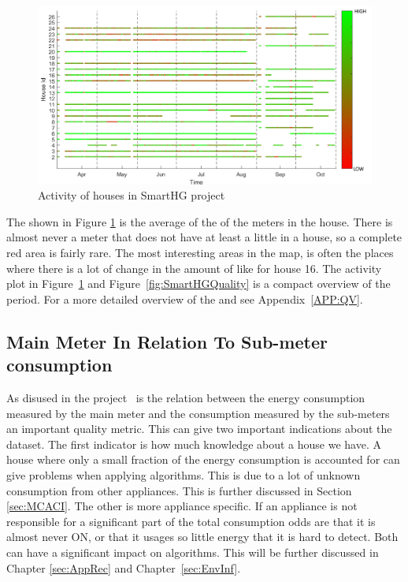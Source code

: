 \begin{figure}[H]
\centering
\includegraphics[width=1\textwidth]{billeder/ActivityBig.png}
\caption{Activity of houses in SmartHG project}
\label{fig:ActivityMap}
\end{figure}

The  shown in Figure \ref{fig:ActivityMap} is the average of the  of the meters in the house. There is almost never a meter that does not have at least a little  in a house, so a complete red area is fairly rare. The most interesting areas in the  map, is often the places where there is a lot of change in the amount of  like for house 16. The activity plot in Figure~\ref{fig:ActivityMap} and Figure~\ref{fig:SmartHGQuality} is a compact overview of the period. For a more detailed overview of the  and  see Appendix~\ref{APP:QV}. 

\subsection{Main Meter In Relation To Sub-meter consumption}
\label{sec:MMIRTSM}
As disused in the  project~\citep{RefWorks:21} is the relation between the energy consumption measured by the main meter and the consumption measured by the sub-meters an important quality metric. This can give two important indications about the dataset. The first indicator is how much knowledge about a house we have. A house where only a small fraction of the energy consumption is accounted for can give problems when applying  algorithms. This is due to a lot of unknown consumption from other appliances. This is further discussed in Section \ref{sec:MCACI}. The other is more appliance specific. If an appliance is not responsible for a significant part of the total consumption odds are that it is almost never ON, or that it usages so little energy that it is hard to detect. Both can have a significant impact on  algorithms. This will be further discussed in Chapter \ref{sec:AppRec} and Chapter~\ref{sec:EnvInf}.  

